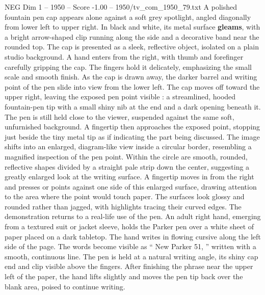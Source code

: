 \begin{textsample}{NEG Dim 1 – 1950 – Score -1.00 – 1950/tv\_com\_1950\_79.txt}  \label{ex:f1_neg_019}
A polished fountain pen cap appears alone against a soft grey spotlight, angled diagonally from lower left to upper right.
In black and white, its metal surface \textbf{gleams}, with a bright arrow-shaped clip running along the side and a decorative band near the rounded top.
The cap is presented as a sleek, reflective object, isolated on a plain studio background.
A hand enters from the right, with thumb and forefinger carefully gripping the cap.
The fingers hold it delicately, emphasizing the small scale and smooth finish.
As the cap is drawn away, the darker barrel and writing point of the pen slide into view from the lower left.
The cap moves off toward the upper right, leaving the exposed pen point visible : a streamlined, hooded fountain-pen tip with a small shiny nib at the end and a dark opening beneath it.
The pen is still held close to the viewer, suspended against the same soft, unfurnished background.
A fingertip then approaches the exposed point, stopping just beside the tiny metal tip as if indicating the part being discussed.
The image shifts into an enlarged, diagram-like view inside a circular border, resembling a magnified inspection of the pen point.
Within the circle are smooth, rounded, reflective shapes divided by a straight pale strip down the center, suggesting a greatly enlarged look at the writing surface.
A fingertip moves in from the right and presses or points against one side of this enlarged surface, drawing attention to the area where the point would touch paper.
The surfaces look glossy and rounded rather than jagged, with highlights tracing their curved edges.
The demonstration returns to a real-life use of the pen.
An adult right hand, emerging from a textured suit or jacket sleeve, holds the Parker pen over a white sheet of paper placed on a dark tabletop.
The hand writes in flowing cursive along the left side of the page.
The words become visible as “ New Parker 51, ” written with a smooth, continuous line.
The pen is held at a natural writing angle, its shiny cap end and clip visible above the fingers.
After finishing the phrase near the upper left of the paper, the hand lifts slightly and moves the pen tip back over the blank area, poised to continue writing.

\end{textsample}
